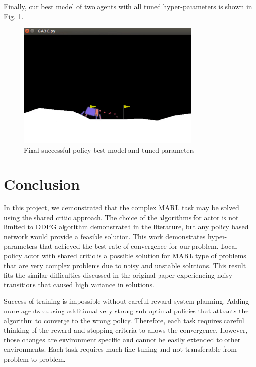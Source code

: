 \documentclass[12pt, letter]{article}
\begin{document}
Finally, our best model of two agents with all tuned hyper-parameters is shown in Fig. \ref{fig:success}.

\begin{figure}[htbp]
	\centering
	\includegraphics[width=0.8\textwidth]{figures/success.png}
	\caption{Final successful policy best model and tuned parameters}
	\label{fig:success}
\end{figure}

\section{Conclusion}
In this project, we demonstrated that the complex MARL task may be solved using the shared critic approach. The choice of the algorithms for actor is not limited to DDPG algorithm demonstrated in the literature, but any policy based network would provide a feasible solution. This work demonstrates hyper-parameters that achieved the best rate of convergence for our problem.
Local policy actor with shared critic is a possible solution for MARL type of problems that are very complex problems due to noisy and unstable solutions. This result fits the similar difficulties discussed in the original paper experiencing noisy transitions that caused high variance in solutions.

Success of training is impossible without careful reward system planning. Adding more agents causing additional very strong sub optimal policies that attracts the algorithm to converge to the wrong policy. Therefore, each task requires careful thinking of the reward and stopping criteria to allows the convergence. However, those changes are environment specific and cannot be easily extended to other environments. Each task requires much fine tuning and not transferable from problem to problem.


\newpage


\end{document}
